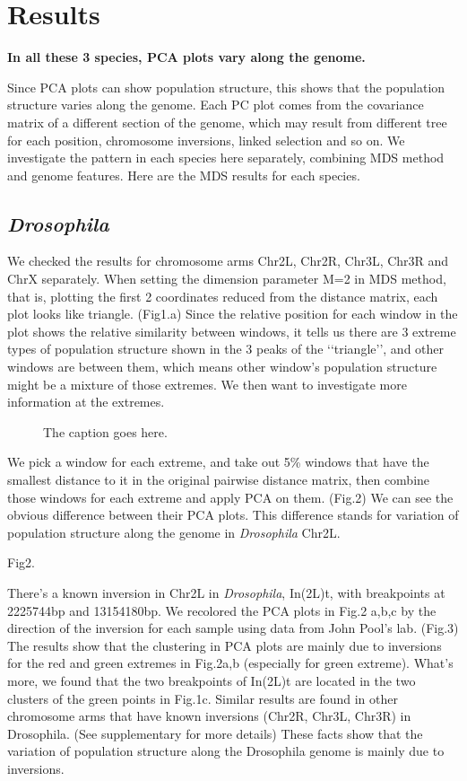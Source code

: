 \documentclass[11pt, oneside]{article}   	%
\begin{document}
\section{Results}
\textbf{In all these 3 species, PCA plots vary along the genome.}

\noindent Since PCA plots can show population structure, this shows that the population structure varies along the genome. Each PC plot comes from the covariance matrix of a different section of the genome, which may result from different tree for each position, chromosome inversions, linked selection and so on. We investigate the pattern in each species here separately, combining MDS method and genome features.
Here are the MDS results for each species.
\subsection{\textit{Drosophila}}
We checked the results for chromosome arms Chr2L, Chr2R, Chr3L, Chr3R and ChrX separately. When setting the dimension parameter M=2 in MDS method, that is, plotting the first 2 coordinates reduced from the distance matrix, each plot looks like triangle.
(Fig1.a) Since the relative position for each window in the plot shows the relative similarity between windows, it tells us there are 3 extreme types of population structure shown in the 3 peaks of the \lq\lq triangle\rq\rq, and other windows are between them, which means other window's population structure might be a mixture of those extremes. We then want to investigate more information at the extremes.

\begin{figure}
    \begin{center}
    \end{center}
    \caption{
        The caption goes here.
        \label{fig:pde_clines}
    }
\end{figure}


\noindent We pick a window for each extreme, and take out 5\% windows that have the smallest distance to it in the original pairwise distance matrix, then combine those windows for each extreme and apply PCA on them. (Fig.2) We can see the obvious difference between their PCA plots. This difference stands for variation of population structure along the genome in \textit{Drosophila} Chr2L.

Fig2.

\noindent There's a known inversion in Chr2L in \textit{Drosophila}, In(2L)t, with breakpoints at 2225744bp and 13154180bp. \cite{key11} We recolored the PCA plots in Fig.2 a,b,c by the direction of the inversion for each sample using data from John Pool's lab. (Fig.3) The results show that the clustering in PCA plots are mainly due to inversions for the red and green extremes in Fig.2a,b (especially for green extreme). What's more, we found that the two breakpoints of In(2L)t are located in the two clusters of the green points in Fig.1c. Similar results are found in other chromosome arms that have known inversions (Chr2R,
Chr3L, Chr3R) in Drosophila. (See supplementary for more details) These facts show that the variation of population structure along the Drosophila genome is mainly due to inversions.
\end{document}
